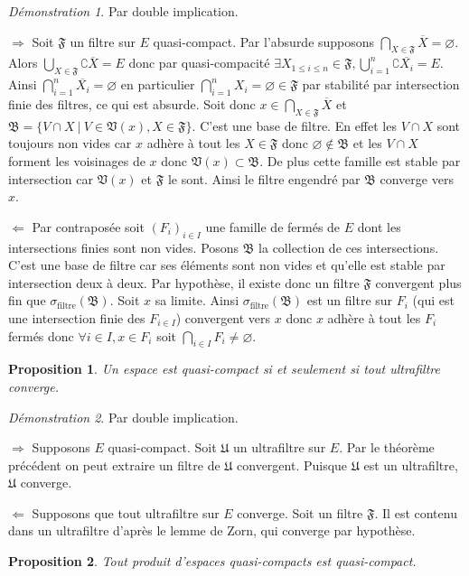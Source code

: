 \documentclass[a4paper, 11pt, french]{book}
\newenvironment{itemise}{\itemize}{\enditemize}
\theoremstyle{plain} %
\newtheorem{proposition}{Proposition}
\theoremstyle{definition} %
\theoremstyle{remark} %
\newtheorem*{demonstration}{Démonstration}
\newcommand{\1}{\mathds{1}}
\newcommand\vide{\varnothing}
\renewcommand{\frak}[1]{\mathfrak{#1}}
\renewcommand{\rm}[1]{\mathrm{#1}}
\newcommand\ens[2]{\{#1 \ |\ #2\}}
\newcommand\equivalence[3]{
	\begin{demonstration}
		#1
		\begin{itemise}
			\item[$\Longrightarrow$] #2
			\item[$\Longleftarrow$] #3
		\end{itemise}
	\end{demonstration}
}
\begin{document}
\equivalence{Par double implication.}{
	Soit $\frak{F}$ un filtre sur $E$ quasi-compact.
	Par l'absurde supposons $\bigcap_{X\in\frak{F}}\overline{X}=\vide$.
	Alors $\bigcup_{X\in\frak{F}}\complement\overline{X}=E$ donc par quasi-compacité $\exists X_{1\leqslant i\leqslant n}\in\frak{F}, \bigcup_{i=1}^n\complement\overline{X_i}=E$.
	Ainsi $\bigcap_{i=1}^n\overline{X_i}=\vide$ en particulier $\bigcap_{i=1}^nX_i=\vide\in\frak{F}$ par stabilité par intersection finie des filtres, ce qui est absurde.
	Soit donc $x\in\bigcap_{X\in\frak{F}}\overline{X}$ et $\frak{B}=\ens{V\cap X}{V\in\frak{V}(x), X\in\frak{F}}$.
	C'est une base de filtre.
	En effet les $V\cap X$ sont toujours non vides car $x$ adhère à tout les $X\in\frak{F}$ donc $\vide\notin\frak{B}$ et les $V\cap X$ forment les voisinages de $x$ donc $\frak{V}(x)\subset\frak{B}$.
	De plus cette famille est stable par intersection car $\frak{V}(x)$ et $\frak{F}$ le sont.
	Ainsi le filtre engendré par $\frak{B}$ converge vers $x$.
}{
	Par contraposée soit $(F_i)_{i\in I}$ une famille de fermés de $E$ dont les intersections finies sont non vides.
	Posons $\frak{B}$ la collection de ces intersections.
	C'est une base de filtre car ses éléments sont non vides et qu'elle est stable par intersection deux à deux.
	Par hypothèse, il existe donc un filtre $\frak{F}$ convergent plus fin que $\sigma_\rm{filtre}(\frak{B})$.
	Soit $x$ sa limite.
	Ainsi $\sigma_\rm{filtre}(\frak{B})$ est un filtre sur $F_i$ (qui est une intersection finie des $F_{i\in I}$) convergent vers $x$ donc $x$ adhère à tout les $F_i$ fermés donc $\forall i\in I, x\in F_i$ soit $\bigcap_{i\in I}F_i\neq\vide$.
}

\begin{proposition}
	Un espace est quasi-compact si et seulement si tout ultrafiltre converge.
\end{proposition}

\equivalence{Par double implication.}{
	Supposons $E$ quasi-compact.
	Soit $\frak{U}$ un ultrafiltre sur $E$.
	Par le théorème précédent on peut extraire un filtre de $\frak{U}$ convergent.
	Puisque $\frak{U}$ est un ultrafiltre, $\frak{U}$ converge.
}{
	Supposons que tout ultrafiltre sur $E$ converge.
	Soit un filtre $\frak{F}$.
	Il est contenu dans un ultrafiltre d'après le lemme de Zorn, qui converge par hypothèse.
}

\begin{proposition}
	Tout produit d’espaces quasi-compacts est quasi-compact.
\end{proposition}
\end{document}
